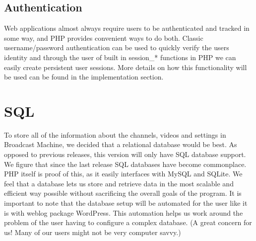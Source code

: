 \documentclass[a4paper,12pt]{report}
\begin{document}
\subsection{Authentication}
Web applications almost always require users to be authenticated and tracked in some way, and PHP provides convenient ways to do both.
Classic username/password authentication can be used to quickly verify the users identity and through the user of built in session\_* functions in PHP we can easily create persistent user sessions.
More details on how this functionality will be used can be found in the implementation section.


\section{SQL}
To store all of the information about the channels, videos and settings in Broadcast Machine, we decided that a relational database would be best. 
As opposed to previous releases, this version will only have SQL database support.
We figure that since the last release SQL databases have become commonplace.
PHP itself is proof of this, as it easily interfaces with MySQL and SQLite.
We feel that a database lets us store and retrieve data in the most scalable and efficient way possible without sacrificing the overall goals of the program.
It is important to note that the database setup will be automated for the user like it is with weblog package WordPress.
This automation helps us work around the problem of the user having to configure a complex database. (A great concern for us! Many of our users might not be very computer savvy.)
\end{document}
